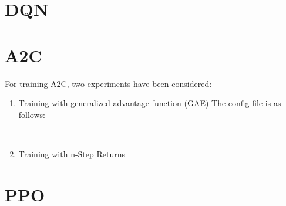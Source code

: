 \documentclass[12pt,a4paper]{report}
\begin{document}
	\section{DQN}
	
	\section{A2C}
	
	For training A2C, two experiments have been considered: 
	\begin{enumerate}
		\item Training with generalized advantage function (GAE)
		The config file is as follows:
		\begin{lstlisting}
			
		\end{lstlisting}
		
		\item Training with n-Step Returns
	\end{enumerate}
	
	\section{PPO}
	
\end{document}

